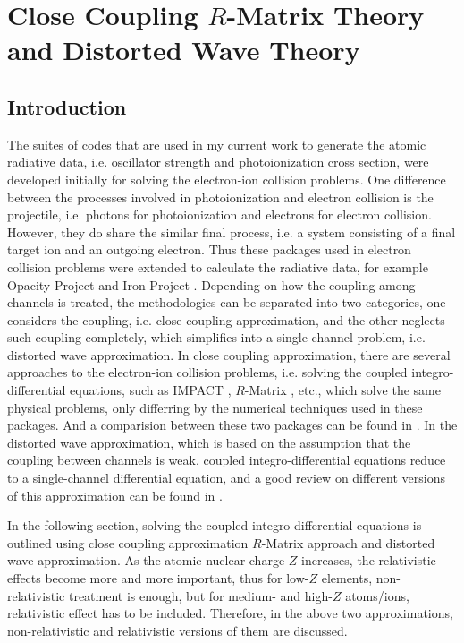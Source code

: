 \chapter{Close Coupling $R$-Matrix Theory and Distorted Wave Theory}
\label{chap_bprm_rdw_theory}

\section{Introduction}
The suites of codes that are used in my current work to generate the atomic radiative data, i.e. oscillator strength and photoionization cross section, were developed initially for solving the electron-ion collision problems. One difference between the processes involved in photoionization and electron collision is the projectile, i.e. photons for photoionization and electrons for electron collision. However, they do share the similar final process, i.e. a system consisting of a final target ion and an outgoing electron. Thus these packages used in electron collision problems were extended to calculate the radiative data, for example Opacity Project \citep{opcd_1, opcd_2} and Iron Project \citep{ip_1}. Depending on how the coupling among channels is treated, the methodologies can be separated into two categories, one considers the coupling, i.e. close coupling approximation, and the other neglects such coupling completely, which simplifies into a single-channel problem, i.e. distorted wave approximation. In close coupling approximation, there are several approaches to the electron-ion collision problems, i.e. solving the coupled integro-differential equations, such as IMPACT \citep{impact_3, impact_1, impact_2}, $R$-Matrix \citep{rm_1, rm_2, rm_3}, etc., which solve the same physical problems, only differring by the numerical techniques used in these packages. And a comparision between these two packages can be found in \citet{comp_impact_rm}. In the distorted wave approximation, which is based on the assumption that the coupling between channels is weak, coupled integro-differential equations reduce to a single-channel differential equation, and a good review on different versions of this approximation can be found in \citet{dw_review_1}.

In the following section, solving the coupled integro-differential equations is outlined using close coupling approximation $R$-Matrix approach and distorted wave approximation. As the atomic nuclear charge $Z$ increases, the relativistic effects become more and more important, thus for low-$Z$ elements, non-relativistic treatment is enough, but for medium- and high-$Z$ atoms/ions, relativistic effect has to be included. Therefore, in the above two approximations, non-relativistic and relativistic versions of them are discussed.


